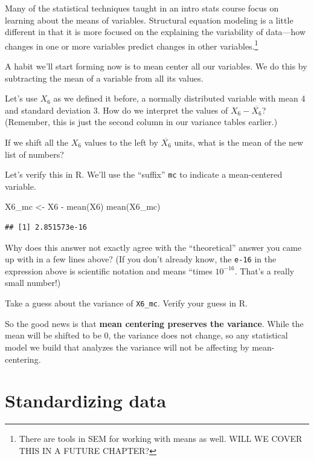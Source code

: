 \documentclass[
]{book}
\newenvironment{Shaded}{\begin{snugshade}}{\end{snugshade}}
\newcommand{\FunctionTok}[1]{\textcolor[rgb]{0.00,0.00,0.00}{#1}}
\newcommand{\NormalTok}[1]{#1}
\newcommand{\OtherTok}[1]{\textcolor[rgb]{0.56,0.35,0.01}{#1}}
\newcommand{\SpecialCharTok}[1]{\textcolor[rgb]{0.00,0.00,0.00}{#1}}
\begin{document}
Many of the statistical techniques taught in an intro stats course focus on learning about the means of variables. Structural equation modeling is a little different in that it is more focused on the explaining the variability of data---how changes in one or more variables predict changes in other variables.\footnote{There are tools in SEM for working with means as well. WILL WE COVER THIS IN A FUTURE CHAPTER?}

A habit we'll start forming now is to mean center all our variables. We do this by subtracting the mean of a variable from all its values.

Let's use \(X_{6}\) as we defined it before, a normally distributed variable with mean 4 and standard deviation 3. How do we interpret the values of \(X_{6} - \overline{X_{6}}\)? (Remember, this is just the second column in our variance tables earlier.)

If we shift all the \(X_{6}\) values to the left by \(\overline{X_{6}}\) units, what is the mean of the new list of numbers?

Let's verify this in R. We'll use the ``suffix'' \texttt{mc} to indicate a mean-centered variable.

\begin{Shaded}
\begin{Highlighting}[]
\NormalTok{X6\_mc }\OtherTok{\textless{}{-}}\NormalTok{ X6 }\SpecialCharTok{{-}} \FunctionTok{mean}\NormalTok{(X6)}
\FunctionTok{mean}\NormalTok{(X6\_mc)}
\end{Highlighting}
\end{Shaded}

\begin{verbatim}
## [1] 2.851573e-16
\end{verbatim}

Why does this answer not exactly agree with the ``theoretical'' answer you came up with in a few lines above? (If you don't already know, the \texttt{e-16} in the expression above is scientific notation and means ``times \(10^{-16}\). That's a really small number!)

Take a guess about the variance of \texttt{X6\_mc}. Verify your guess in R.

So the good news is that \textbf{mean centering preserves the variance}. While the mean will be shifted to be 0, the variance does not change, so any statistical model we build that analyzes the variance will not be affecting by mean-centering.

\hypertarget{variance-standardizing}{%
\section{Standardizing data}\label{variance-standardizing}}
\end{document}
